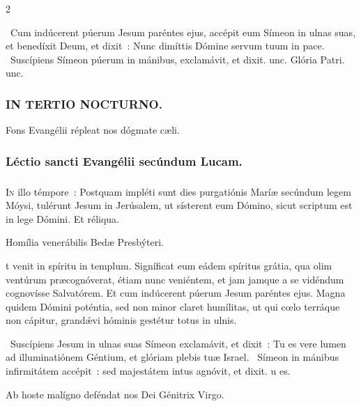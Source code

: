 \documentclass[9pt,twoside]{extarticle}
\begin{document}
\begin{multicols}{2}
\begin{tightlist}{}
\item {}~Cum indúcerent púerum Jesum paréntes ejus, accépit eum Símeon in ulnas suas, et benedíxit Deum, et dixit~: \textred{*} Nunc dimíttis Dómine servum tuum in pace. ~Suscípiens Símeon púerum in mánibus, exclamávit, et dixit. unc. Glória Patri. unc.
\end{tightlist}

\subsubsection*{\center \textsc{IN TERTIO NOCTURNO.}}
\begin{tightlist}{}
\item {\small {} Fons Evangélii répleat nos dógmate cæli.}
\end{tightlist}
\subsubsection*{\center Léctio sancti Evangélii secúndum Lucam.}
\subsubsection*{\center {}}
\lettrine{I}n illo témpore~: Postquam impléti sunt dies purgatiónis Maríæ secúndum legem Móysi, tulérunt Jesum in Jerúsalem, ut sísterent eum Dómino, sicut scriptum est in lege Dómini. Et réliqua.

\begin{center}Homília venerábilis Bedæ Presbýteri.\\
\end{center}
t venit in spíritu in templum. Signíficat eum eádem spíritus grátia, qua olim ventúrum præcognóverat, étiam nunc veniéntem, et jam jamque a se vidéndum cognovísse Salvatórem. Et cum indúcerent púerum Jesum paréntes ejus. Magna quidem Dómini poténtia, sed non minor claret humílitas, ut qui cœlo terráque non cápitur, grandǽvi hóminis gestétur totus in ulnis. 

\begin{tightlist}{}
\item {}~Suscípiens Jesum in ulnas suas Símeon exclamávit, et dixit~: \textred{*} Tu es vere lumen ad illuminatiónem Géntium, et glóriam plebis tuæ Israel. ~Símeon in mánibus infirmitátem accépit~: sed majestátem intus agnóvit, et dixit. u es.
\item {\small {} Ab hoste malígno deféndat nos Dei Génitrix Virgo.}
\end{tightlist}


\end{multicols}
\end{document}
